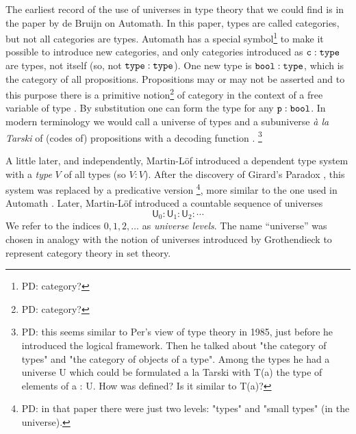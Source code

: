 \documentclass[11pt,a4paper]{article}
\theoremstyle{definition}
\def\UU{\mathsf{U}}
\begin{document}
The earliest record of the use of universes in type theory that we could
find is in the paper \cite{deBruijn68} by de Bruijn on Automath.
In this paper, types are called categories, but not all categories are types.
Automath has a special symbol\footnote{PD: category?}  to make it possible to introduce
new categories, and only categories  introduced as $\text{\tt c}:\text{\tt type}$
are types, not  itself (so, not $\text{\tt type}:\text{\tt type}$).
One new type is $\text{\tt bool}:\text{\tt type}$,
which is the category of all propositions.
Propositions may or may not be asserted
and to this purpose there is a primitive notion\footnote{PD: category?} 
of category 
in the context of a free variable of type .
By substitution one can form the type  for any $\text{\tt p}:\text{\tt bool}$.
In modern terminology we would call  a universe of
types and  a subuniverse \emph{à la Tarski} of
(codes of) propositions with a decoding function .
\footnote{PD: this seems similar to Per's view of type theory in 1985, just before he introduced the logical framework. Then he talked about "the category of types" and "the category of objects of a type". Among the types he had a universe U which could be formulated a la Tarski with T(a) the type of elements of a : U. How was   defined? Is it similar to T(a)?}


A little later, and independently, Martin-Löf \cite{ML71} introduced a dependent
type system with a \emph{type} $V$ of all types (so $V:V$).
After the discovery of Girard's Paradox \cite{Girard71}, this system was replaced by a predicative
version \cite{ML72}\footnote{PD: in that paper there were just two levels: "types" and "small types" (in the universe).}, more similar to the one used in Automath \cite{deBruijn68}.
Later, Martin-L\"of \cite{martinlof:predicative} introduced a countable sequence of universes
$$
\UU_0 : \UU_1 : \UU_2 : \cdots
$$
We refer to the indices $0, 1, 2, \ldots$ as {\em universe levels}. The name ``universe'' was chosen
in analogy with the notion of universes introduced by Grothendieck to represent category theory
in set theory.
\end{document}
